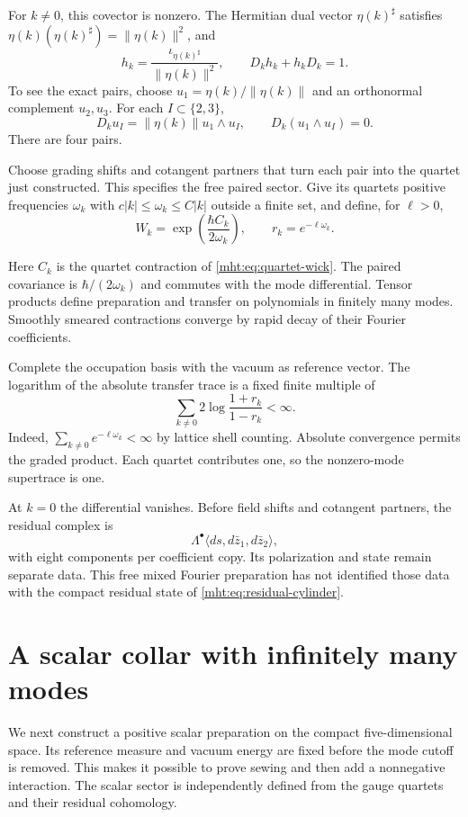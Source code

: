 For $k\ne0$, this covector is nonzero. The Hermitian dual
vector $\eta(k)^\sharp$ satisfies
$\eta(k)(\eta(k)^\sharp)=\|\eta(k)\|^2$, and
\begin{equation}\label{mht:eq:mixed-fourier-contraction}
 h_k=\frac{\iota_{\eta(k)^\sharp}}{\|\eta(k)\|^2},
 \qquad D_kh_k+h_kD_k=1.
\end{equation}
To see the exact pairs, choose
$u_1=\eta(k)/\|\eta(k)\|$ and an orthonormal complement
$u_2,u_3$. For each $I\subset\{2,3\}$,
\[
 D_ku_I=\|\eta(k)\|u_1\wedge u_I,
 \qquad D_k(u_1\wedge u_I)=0.
\]
There are four pairs.

Choose grading shifts and cotangent partners that turn each
pair into the quartet just constructed. This specifies the
free paired sector. Give its quartets positive frequencies
$\omega_k$ with $c|k|\leq\omega_k\leq C|k|$ outside a finite
set, and define, for $\ell>0$,
\[
 W_k=\exp\!\left(\frac{\hbar C_k}{2\omega_k}\right),
 \qquad r_k=e^{-\ell\omega_k}.
\]

Here $C_k$ is the quartet contraction of
\eqref{mht:eq:quartet-wick}. The paired covariance is
$\hbar/(2\omega_k)$ and commutes with the mode differential.
Tensor products define preparation and transfer on polynomials
in finitely many modes. Smoothly smeared contractions converge
by rapid decay of their Fourier coefficients.

Complete the occupation basis with the vacuum as reference
vector. The logarithm of the absolute transfer trace is a
fixed finite multiple of
\[
 \sum_{k\ne0}2\log\frac{1+r_k}{1-r_k}<\infty.
\]
Indeed, $\sum_{k\ne0}e^{-\ell\omega_k}<\infty$ by lattice
shell counting. Absolute convergence permits the graded
product. Each quartet contributes one, so the nonzero-mode
supertrace is one.

At $k=0$ the differential vanishes. Before field shifts and
cotangent partners, the residual complex is
\[
 \Lambda^\bullet\langle ds,d\bar z_1,d\bar z_2\rangle,
\]
with eight components per coefficient copy. Its polarization
and state remain separate data. This free mixed Fourier
preparation has not identified those data with the compact
residual state of \eqref{mht:eq:residual-cylinder}.

\section{A scalar collar with infinitely many modes}

We next construct a positive scalar preparation on the compact
five-dimensional space. Its reference measure and vacuum energy
are fixed before the mode cutoff is removed. This makes it
possible to prove sewing and then add a nonnegative interaction.
The scalar sector is independently defined from the gauge
quartets and their residual cohomology.

